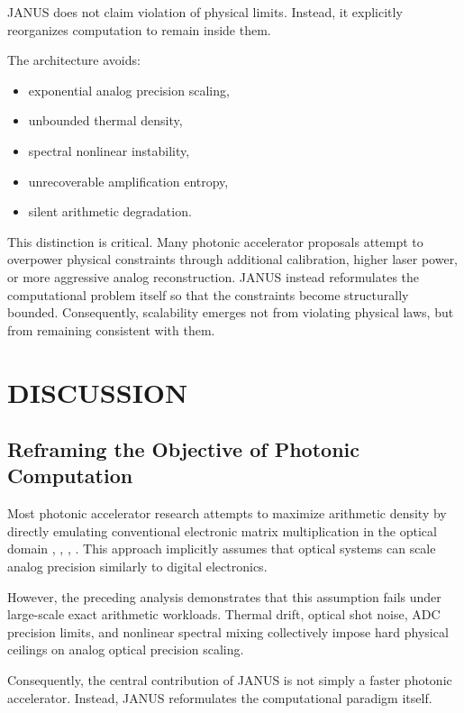 \documentclass[journal]{IEEEtran}
\begin{document}
JANUS does not claim violation of physical limits. Instead, it explicitly reorganizes computation to remain inside them.

The architecture avoids:
\begin{itemize}
\item exponential analog precision scaling,
\item unbounded thermal density,
\item spectral nonlinear instability,
\item unrecoverable amplification entropy,
\item silent arithmetic degradation.
\end{itemize}

This distinction is critical. Many photonic accelerator proposals attempt to overpower physical constraints through additional calibration, higher laser power, or more aggressive analog reconstruction. JANUS instead reformulates the computational problem itself so that the constraints become structurally bounded. Consequently, scalability emerges not from violating physical laws, but from remaining consistent with them.

\section{DISCUSSION}


\subsection{\textbf{Reframing the Objective of Photonic Computation}}

Most photonic accelerator research attempts to maximize arithmetic density by directly emulating conventional electronic matrix multiplication in the optical domain \cite{Sorger2018}, \cite{Feldmann2021}, \cite{Miscuglio2020}, \cite{Zhang2025}. This approach implicitly assumes that optical systems can scale analog precision similarly to digital electronics.

However, the preceding analysis demonstrates that this assumption fails under large-scale exact arithmetic workloads. Thermal drift, optical shot noise, ADC precision limits, and nonlinear spectral mixing collectively impose hard physical ceilings on analog optical precision scaling.

Consequently, the central contribution of JANUS is not simply a faster photonic accelerator. Instead, JANUS reformulates the computational paradigm itself.
\end{document}
